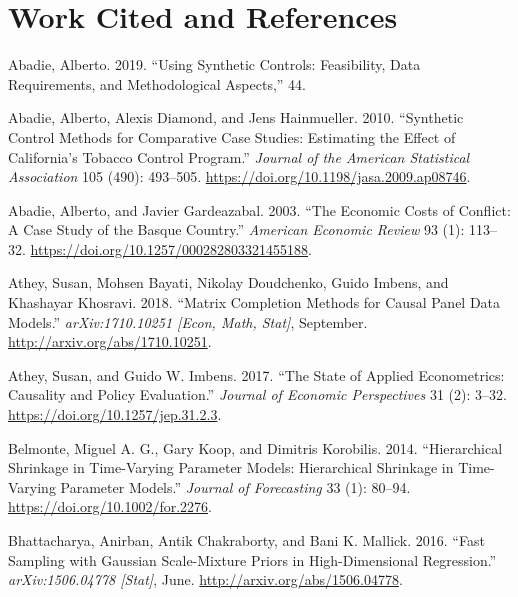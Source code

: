 \documentclass[
]{article}
\begin{document}
\hypertarget{work-cited-and-references}{%
\section*{Work Cited and References}\label{work-cited-and-references}}

\hypertarget{refs}{}
\leavevmode\hypertarget{ref-abadie_using_2019}{}%
Abadie, Alberto. 2019. ``Using Synthetic Controls: Feasibility, Data
Requirements, and Methodological Aspects,'' 44.

\leavevmode\hypertarget{ref-abadie_synthetic_2010}{}%
Abadie, Alberto, Alexis Diamond, and Jens Hainmueller. 2010. ``Synthetic
Control Methods for Comparative Case Studies: Estimating the Effect of
California's Tobacco Control Program.'' \emph{Journal of the American
Statistical Association} 105 (490): 493--505.
\url{https://doi.org/10.1198/jasa.2009.ap08746}.

\leavevmode\hypertarget{ref-abadie_economic_2003}{}%
Abadie, Alberto, and Javier Gardeazabal. 2003. ``The Economic Costs of
Conflict: A Case Study of the Basque Country.'' \emph{American Economic
Review} 93 (1): 113--32.
\url{https://doi.org/10.1257/000282803321455188}.

\leavevmode\hypertarget{ref-athey_matrix_2018}{}%
Athey, Susan, Mohsen Bayati, Nikolay Doudchenko, Guido Imbens, and
Khashayar Khosravi. 2018. ``Matrix Completion Methods for Causal Panel
Data Models.'' \emph{arXiv:1710.10251 {[}Econ, Math, Stat{]}},
September. \url{http://arxiv.org/abs/1710.10251}.

\leavevmode\hypertarget{ref-athey_state_2017}{}%
Athey, Susan, and Guido W. Imbens. 2017. ``The State of Applied
Econometrics: Causality and Policy Evaluation.'' \emph{Journal of
Economic Perspectives} 31 (2): 3--32.
\url{https://doi.org/10.1257/jep.31.2.3}.

\leavevmode\hypertarget{ref-belmonte_hierarchical_2014}{}%
Belmonte, Miguel A. G., Gary Koop, and Dimitris Korobilis. 2014.
``Hierarchical Shrinkage in Time-Varying Parameter Models: Hierarchical
Shrinkage in Time-Varying Parameter Models.'' \emph{Journal of
Forecasting} 33 (1): 80--94. \url{https://doi.org/10.1002/for.2276}.

\leavevmode\hypertarget{ref-bhattacharya_fast_2016}{}%
Bhattacharya, Anirban, Antik Chakraborty, and Bani K. Mallick. 2016.
``Fast Sampling with Gaussian Scale-Mixture Priors in High-Dimensional
Regression.'' \emph{arXiv:1506.04778 {[}Stat{]}}, June.
\url{http://arxiv.org/abs/1506.04778}.
\end{document}
